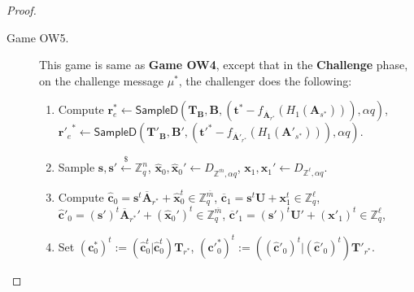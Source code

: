 \documentclass[a4paper,11pt,onecolumn]{elsarticle}
\begin{document}
\begin{proof}
\begin{description}
				\item[Game OW5.] This game is same as \textbf{Game OW4}, except that in the \textbf{Challenge} phase, on  the challenge message $\mu^*$,  the challenger does the following:
				\begin{enumerate}
				\item Compute $\textbf{r}_e^* \leftarrow \textsf{SampleD}(\textbf{T}_\textbf{B}, \textbf{B}, (\textbf{t}^*-f_{\overline{\textbf{A}}_{r^*}}(H_1(\textbf{A}_{s^*}))),\alpha q)$,  ${\textbf{r}'_e}^* \leftarrow \textsf{SampleD}(\textbf{T}'_\textbf{B}, \textbf{B}', (\textbf{t}'^*-f_{\overline{\textbf{A}}'_{r^*}}(H_1(\textbf{A}'_{s^*}))),\alpha q)$.  
					\item Sample  $\textbf{s}, \textbf{s}' \xleftarrow{\$} \mathbb{Z}_q^{n}$, \quad  $\hat{\textbf{x}}_0, \hat{\textbf{x}}_0'\leftarrow D_{\mathbb{Z}^{\overline{m}}, \alpha q}$, \quad  $\textbf{x}_1, \textbf{x}_1'\leftarrow D_{\mathbb{Z}^{\ell}, \alpha q}$.
					\item Compute $\hat{\textbf{c}}_0=\textbf{s}^t\overline{\mathbf{A}}_{r^*}+ \hat{\textbf{x}}^t_0 \in \mathbb{Z}_q^{\overline{m}}$, $\overline{\textbf{c}}_1=\textbf{s}^t\textbf{U}+ \textbf{x}^t_1 \in \mathbb{Z}_q^{\ell}$,
					$\hat{\textbf{c}}'_0=(\textbf{s}')^t\overline{\mathbf{A}}_{r^*}'+ (\hat{\textbf{x}}_0')^t \in \mathbb{Z}_q^{\overline{m}}$, $\overline{\textbf{c}}'_1=(\textbf{s}')^t\textbf{U}'+ (\textbf{x}'_1)^t \in \mathbb{Z}_q^{\ell}$,
			\item Set  ${(\textbf{c}^*_0)}^t:=(\hat{\textbf{c}}_0^t|\hat{\textbf{c}}_0^t)\textbf{T}_{r^*}$, \quad  ${(\textbf{c}'^*_0)}^t:=((\hat{\textbf{c}}'_0)^t|(\hat{\textbf{c}}'_0)^t)\textbf{T}'_{r^*}$.
		

\end{enumerate}
\end{description}
\end{proof}
\end{document}
